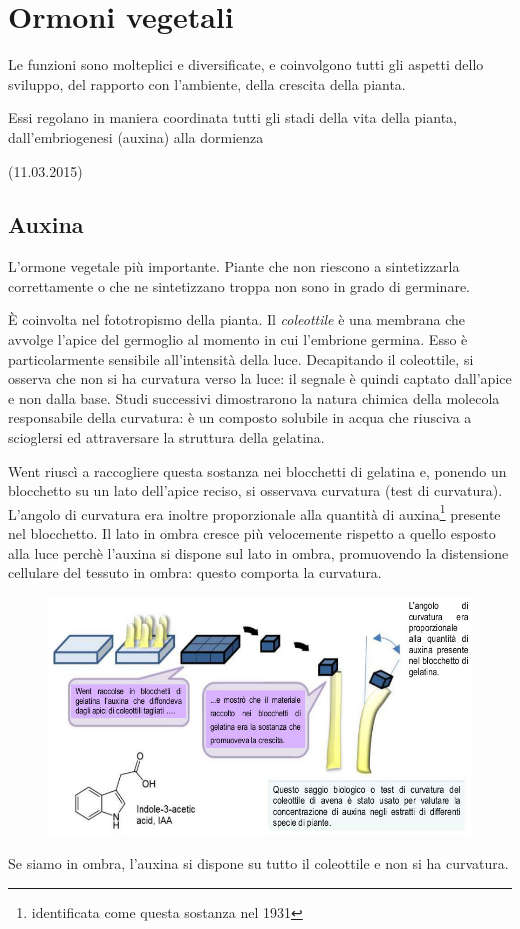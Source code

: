\documentclass[a4paper,12pt]{book}
\begin{document}
\chapter{Ormoni vegetali} 

Le funzioni sono molteplici e diversificate, e coinvolgono tutti gli aspetti dello sviluppo, del rapporto con l'ambiente, della crescita della pianta.

Essi regolano in maniera coordinata tutti gli stadi della vita della pianta, dall'embriogenesi (auxina) alla dormienza
 
(11.03.2015) 
\section{Auxina} 
L'ormone vegetale più importante. Piante che non riescono a sintetizzarla correttamente o che ne sintetizzano troppa non sono in grado di germinare.

È coinvolta nel fototropismo della pianta. Il \emph{coleottile} è una membrana che avvolge l'apice del germoglio al momento in cui l'embrione germina. Esso è particolarmente sensibile all'intensità della luce. Decapitando il coleottile, si osserva che non si ha curvatura verso la luce: il segnale è quindi captato dall'apice e non dalla base. Studi successivi dimostrarono la natura chimica della molecola responsabile della curvatura: è un composto solubile in acqua che riusciva a scioglersi ed attraversare la struttura della gelatina.

Went riuscì a raccogliere questa sostanza nei blocchetti di gelatina e, ponendo un blocchetto su un lato dell'apice reciso, si osservava curvatura (test di curvatura). L'angolo di curvatura era inoltre proporzionale alla quantità di auxina\footnote{identificata come questa sostanza nel 1931} presente nel blocchetto. Il lato in ombra cresce più velocemente rispetto a quello esposto alla luce perchè l'auxina si dispone sul lato in ombra, promuovendo la distensione cellulare del tessuto in ombra: questo comporta la curvatura.
\begin{figure}[H]
\centering
\includegraphics[scale=0.4]{immagini/coleottile.jpg}
\end{figure}
Se siamo in ombra, l'auxina si dispone su tutto il coleottile e non si ha curvatura.
\end{document}
